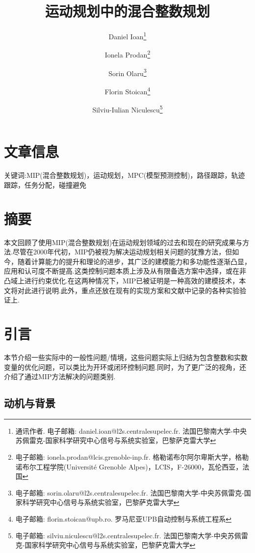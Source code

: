 \documentclass[10pt]{article}
\begin{document}
\title{运动规划中的混合整数规划}
\author{Daniel Ioan\thanks{通讯作者. 电子邮箱: daniel.ioan@l2s.centralesupelec.fr. 法国巴黎南大学-中央苏佩雷克-国家科学研究中心信号与系统实验室，巴黎萨克雷大学} \and Ionela Prodan\thanks{电子邮箱: ionela.prodan@lcis.grenoble-inp.fr. 格勒诺布尔阿尔卑斯大学，格勒诺布尔工程学院(Université Grenoble Alpes)，LCIS，F-26000，瓦伦西亚，法国} \and Sorin Olaru\thanks{电子邮箱: sorin.olaru@l2s.centralesupelec.fr. 法国巴黎南大学-中央苏佩雷克-国家科学研究中心信号与系统实验室，巴黎萨克雷大学} \and Florin Stoican\thanks{电子邮箱: florin.stoican@upb.ro. 罗马尼亚UPB自动控制与系统工程系} \and Silviu-Iulian Niculescu\thanks{电子邮箱: silviu.niculescu@l2s.centralesupelec.fr. 法国巴黎南大学-中央苏佩雷克-国家科学研究中心信号与系统实验室，巴黎萨克雷大学}}
\date{}
\maketitle

\section*{文章信息}

关键词:MIP(混合整数规划)，运动规划，MPC(模型预测控制)，路径跟踪，轨迹跟踪，任务分配，碰撞避免

\section*{摘要}

本文回顾了使用MIP(混合整数规划)在运动规划领域的过去和现在的研究成果与方法.尽管在2000年代初，MIP仍被视为解决运动规划相关问题的犹豫方法，但如今，随着计算能力的提升和理论的进步，其广泛的建模能力和多功能性逐渐凸显，应用和认可度不断提高.这类控制问题本质上涉及从有限备选方案中选择，或在非凸域上进行约束优化.在这两种情况下，MIP已被证明是一种高效的建模技术，本文将对此进行说明.此外，重点还放在现有的实现方案和文献中记录的各种实验验证上.

\section{引言}

本节介绍一些实际中的一般性问题/情境，这些问题实际上归结为包含整数和实数变量的优化问题，可以类比为开环或闭环控制问题.同时，为了更广泛的视角，还介绍了通过MIP方法解决的问题类别.

\subsection{动机与背景}
\end{document}
